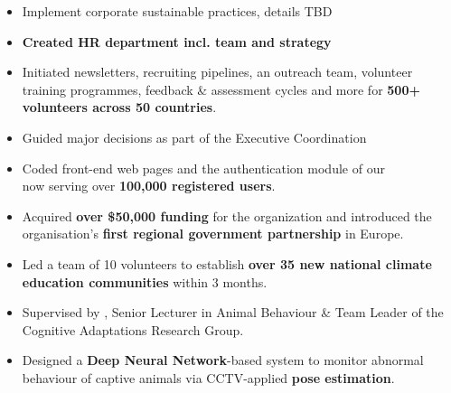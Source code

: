 \documentclass[10pt,a4paper,ragged2e,withhyper]{altacv}
\begin{document}
\begin{paracol}{2}


\begin{itemize}
    \item Implement corporate sustainable practices, details TBD
\end{itemize}

\medskip\medskip

\begin{itemize}
    \item \textbf{Created HR department incl. team and strategy}
    \item Initiated newsletters, recruiting pipelines, an outreach team, volunteer training programmes, feedback \& assessment cycles and more for \textbf{500+ volunteers across 50 countries}.
    \item Guided major decisions as part of the Executive Coordination
\end{itemize}

\medskip\medskip

\begin{itemize}
    \item Coded front-end web pages and the authentication module of our\\  now serving over \textbf{100,000 registered users}.
    \item Acquired \textbf{over \$50,000 funding} for the organization and introduced the organisation's \textbf{first regional government partnership} in Europe.
    \item Led a team of 10 volunteers to establish \textbf{over 35 new national climate education communities} within 3 months.
\end{itemize}
 

\begin{itemize}
    \item Supervised by , Senior Lecturer in Animal Behaviour \& Team Leader of the Cognitive Adaptations Research Group.
    \item Designed a \textbf{Deep Neural Network}-based system to monitor abnormal behaviour of captive animals via CCTV-applied \textbf{pose estimation}.
\end{itemize}


\end{paracol}
\end{document}
